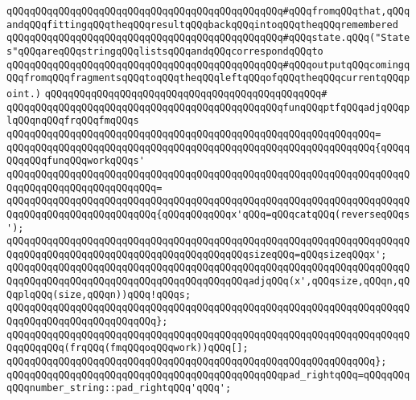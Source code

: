 \verb|qQQqqQQqqQQqqQQqqQQqqQQqqQQqqQQqqQQqqQQqqQQqqQQq#qQQqfromqQQqthat,qQQqandqQQqfittingqQQqtheqQQqresultqQQqbackqQQqintoqQQqtheqQQqremembered|\newline
\verb|qQQqqQQqqQQqqQQqqQQqqQQqqQQqqQQqqQQqqQQqqQQqqQQq#qQQqstate.qQQq("States"qQQqareqQQqstringqQQqlistsqQQqandqQQqcorrespondqQQqto|\newline
\verb|qQQqqQQqqQQqqQQqqQQqqQQqqQQqqQQqqQQqqQQqqQQqqQQq#qQQqoutputqQQqcomingqQQqfromqQQqfragmentsqQQqtoqQQqtheqQQqleftqQQqofqQQqtheqQQqcurrentqQQqpoint.)|\newline
\verb|qQQqqQQqqQQqqQQqqQQqqQQqqQQqqQQqqQQqqQQqqQQqqQQq#|\newline
\verb|qQQqqQQqqQQqqQQqqQQqqQQqqQQqqQQqqQQqqQQqqQQqqQQqfunqQQqptfqQQqadjqQQqplqQQqnqQQqfrqQQqfmqQQqs|\newline
\verb|qQQqqQQqqQQqqQQqqQQqqQQqqQQqqQQqqQQqqQQqqQQqqQQqqQQqqQQqqQQqqQQq=|\newline
\verb|qQQqqQQqqQQqqQQqqQQqqQQqqQQqqQQqqQQqqQQqqQQqqQQqqQQqqQQqqQQqqQQq{qQQqqQQqqQQqfunqQQqworkqQQqs'|\newline
\verb|qQQqqQQqqQQqqQQqqQQqqQQqqQQqqQQqqQQqqQQqqQQqqQQqqQQqqQQqqQQqqQQqqQQqqQQqqQQqqQQqqQQqqQQqqQQqqQQq=|\newline
\verb|qQQqqQQqqQQqqQQqqQQqqQQqqQQqqQQqqQQqqQQqqQQqqQQqqQQqqQQqqQQqqQQqqQQqqQQqqQQqqQQqqQQqqQQqqQQqqQQq{qQQqqQQqqQQqx'qQQq=qQQqcatqQQq(reverseqQQqs');|\newline
\verb|qQQqqQQqqQQqqQQqqQQqqQQqqQQqqQQqqQQqqQQqqQQqqQQqqQQqqQQqqQQqqQQqqQQqqQQqqQQqqQQqqQQqqQQqqQQqqQQqqQQqqQQqqQQqqQQqsizeqQQq=qQQqsizeqQQqx';|\newline
\newline
\verb|qQQqqQQqqQQqqQQqqQQqqQQqqQQqqQQqqQQqqQQqqQQqqQQqqQQqqQQqqQQqqQQqqQQqqQQqqQQqqQQqqQQqqQQqqQQqqQQqqQQqqQQqqQQqqQQqadjqQQq(x',qQQqsize,qQQqn,qQQqplqQQq(size,qQQqn))qQQq!qQQqs;|\newline
\verb|qQQqqQQqqQQqqQQqqQQqqQQqqQQqqQQqqQQqqQQqqQQqqQQqqQQqqQQqqQQqqQQqqQQqqQQqqQQqqQQqqQQqqQQqqQQqqQQq};|\newline
\newline
\verb|qQQqqQQqqQQqqQQqqQQqqQQqqQQqqQQqqQQqqQQqqQQqqQQqqQQqqQQqqQQqqQQqqQQqqQQqqQQqqQQq(frqQQq(fmqQQqoqQQqwork))qQQq[];|\newline
\verb|qQQqqQQqqQQqqQQqqQQqqQQqqQQqqQQqqQQqqQQqqQQqqQQqqQQqqQQqqQQqqQQq};|\newline
\newline
\verb|qQQqqQQqqQQqqQQqqQQqqQQqqQQqqQQqqQQqqQQqqQQqqQQqpad_rightqQQq=qQQqqQQqqQQqnumber_string::pad_rightqQQq'qQQq';|\newline
